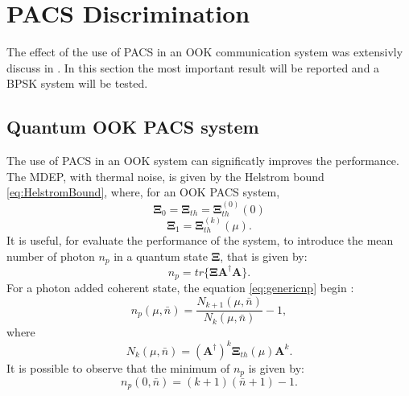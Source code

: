 \section{PACS Discrimination}
    The effect of the use of PACS in an OOK communication system was extensivly discuss in
    \cite{PACSDisc}. In this section the most important result will be reported and a BPSK
    system will be tested.

    \subsection{Quantum OOK PACS system}
    The use of PACS in an OOK system can significatly improves the performance. The MDEP, with
    thermal noise, is given by the Helstrom bound \ref{eq:HelstromBound}, where, for an OOK PACS
    system,
    \begin{equation}
        \pmb{\Xi}_0 =  \pmb{\Xi}_{th} = \pmb{\Xi}_{th}^{(0)}(0)
    \end{equation}
    \begin{equation*}
        \pmb{\Xi}_1 =  \pmb{\Xi}_{th}^{(k)}(\mu).
    \end{equation*}
    It is useful, for evaluate the performance of the system, to introduce the mean number
    of photon $n_p$ in a quantum state $\pmb{\Xi}$, that is given by:
    \begin{equation}
        n_p = tr\{\pmb{\Xi}\pmb{A}^\dagger\pmb{A}\}.
        \label{eq:genericnp}
    \end{equation}
    For a photon added coherent state, the equation \ref{eq:genericnp} begin \cite{PACSDisc}:
    \begin{equation}
        n_p(\mu,\bar{n}) = \frac{N_{k+1}(\mu,\bar{n})}{N_k(\mu,\bar{n})}-1,
        \label{eq:np}
    \end{equation}
    where
    \begin{equation}
        N_k(\mu,\bar{n}) = (\pmb{A}^\dagger)^k \pmb{\Xi}_{th}(\mu) \pmb{A}^k.
    \end{equation}
    It is possible to observe that the minimum of $n_p$ is given by:
    \begin{equation}
        n_p(0,\bar{n}) = (k+1)(\bar{n}+1)-1.
    \end{equation}

